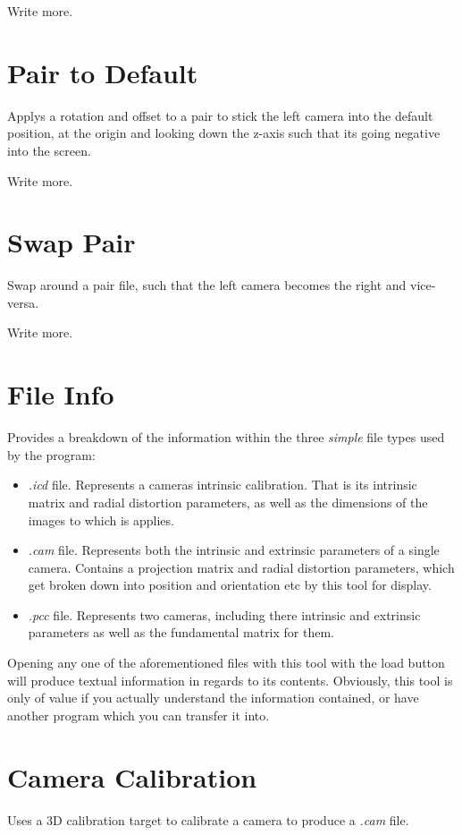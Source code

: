\documentclass[10pt,a4paper,twoside]{article}
\begin{document}
Write more.



\section{Pair to Default}
Applys a rotation and offset to a pair to stick the left camera into the default position, at the origin and looking down the z-axis such that its going negative into the screen.

Write more.



\section{Swap Pair}
Swap around a pair file, such that the left camera becomes the right and vice-versa.

Write more.



\section{File Info}
Provides a breakdown of the information within the three \emph{simple} file types used  by the program:
\begin{itemize}
\item \emph{.icd} file. Represents a cameras intrinsic calibration. That is its intrinsic matrix and radial distortion parameters, as well as the dimensions of the images to which is applies.

\item \emph{.cam} file. Represents both the intrinsic and extrinsic parameters of a single camera. Contains a projection matrix and radial distortion parameters, which get broken down into position and orientation etc by this tool for display.

\item \emph{.pcc} file. Represents two cameras, including there intrinsic and extrinsic parameters as well as the fundamental matrix for them.
\end{itemize}
Opening any one of the aforementioned files with this tool with the load button will produce textual information in regards to its contents. Obviously, this tool is only of value if you actually understand the information contained, or have another program which you can transfer it into.



\section{Camera Calibration}
Uses a 3D calibration target to calibrate a camera to produce a \emph{.cam} file.
\end{document}
